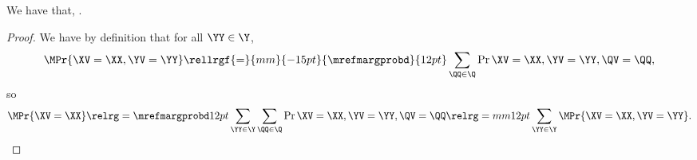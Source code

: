 \begin{proposition}
  We have that, \mprobgprop.%
\end{proposition}

\begin{proof}
  We have by definition that for all $\YY \in \Y$,
  $$\MPr{\XV = \XX, \YV = \YY} \rellrgf{=}{mm}{-15pt}{\mrefmargprobd}{12pt} \sum_{\QQ \in \Q}\Pr{\XV = \XX, \YV = \YY, \QV = \QQ},$$
  so
  $$\MPr{\XV = \XX} \relrg = {\mrefmargprobd} 12pt \sum_{\YY \in \Y}\sum_{\QQ \in \Q}\Pr{\XV = \XX, \YV = \YY, \QV = \QQ} \relrg = mm 12pt
  \sum_{\YY \in \Y}\MPr{\XV = \XX, \YV = \YY}.$$%
\end{proof}
